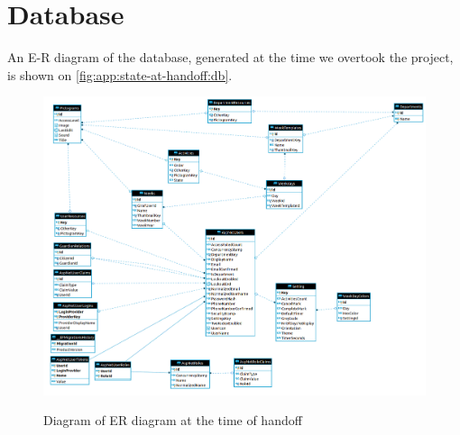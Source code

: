 \section{Database}\label{app:state-at-handoff:db}

An E-R diagram of the database, generated at the time we overtook the project, is shown on \autoref{fig:app:state-at-handoff:db}.

\begin{figure}[h]
    \centering
    \caption{Diagram of ER diagram at the time of handoff}
    \includegraphics[width=1\textwidth]{figures/db_ho.png}
    \label{fig:app:state-at-handoff:db}
\end{figure}
